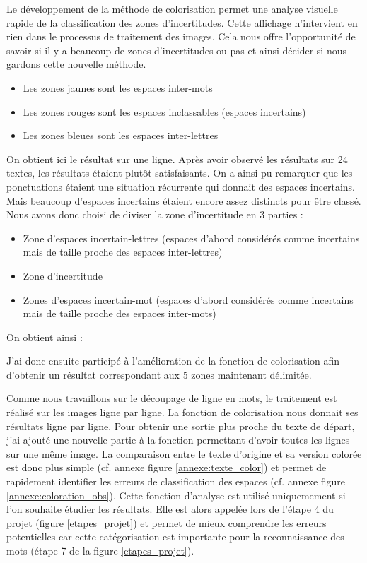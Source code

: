 \documentclass[12pt,a4paper]{article}
\begin{document}
Le développement de la méthode de colorisation permet une analyse visuelle rapide de la classification des zones d'incertitudes. Cette affichage n'intervient en rien dans le processus de traitement des images. Cela nous offre l'opportunité de savoir si il y a beaucoup de zones d'incertitudes ou pas et ainsi décider si nous gardons cette nouvelle méthode.\bigbreak



\begin{itemize}
    \item Les zones jaunes sont les espaces inter-mots
    \item Les zones rouges sont les espaces inclassables (espaces incertains)
    \item Les zones bleues sont les espaces inter-lettres
\end{itemize}

\bigbreak
On obtient ici le résultat sur une ligne. Après avoir observé les résultats sur 24 textes, les résultats étaient plutôt satisfaisants. On a ainsi pu remarquer que les ponctuations étaient une situation récurrente qui donnait des espaces incertains. Mais beaucoup d’espaces incertains étaient encore assez distincts pour être classé.\bigbreak
Nous avons donc choisi de diviser la zone d’incertitude en 3 parties :
\begin{itemize}
    \item Zone d’espaces incertain-lettres (espaces d’abord considérés comme incertains mais de taille proche des espaces inter-lettres)
    \item Zone d’incertitude
    \item Zones d’espaces incertain-mot (espaces d’abord considérés comme incertains mais de taille proche des espaces inter-mots)
\end{itemize}

\bigbreak
On obtient ainsi :


J’ai donc ensuite participé à l’amélioration de la fonction de colorisation afin d’obtenir un résultat correspondant aux 5 zones maintenant délimitée.



Comme nous travaillons sur le découpage de ligne en mots, le traitement est réalisé sur les images ligne par ligne. La fonction de colorisation nous donnait ses résultats ligne par ligne. Pour obtenir une sortie plus proche du texte de départ, j’ai ajouté une nouvelle partie à la fonction permettant d’avoir toutes les lignes sur une même image. La comparaison entre le texte d’origine et sa version colorée est donc plus simple (cf. annexe figure \ref{annexe:texte_color}) et permet de rapidement identifier les erreurs de classification des espaces (cf. annexe figure \ref{annexe:coloration_obs}).\bigbreak
Cette fonction d'analyse est utilisé uniquemement si l'on souhaite étudier les résultats. Elle est alors appelée lors de l’étape 4 du projet (figure \ref{etapes_projet}) et permet de mieux comprendre les erreurs potentielles car cette catégorisation est importante pour la reconnaissance des mots (étape 7 de la figure \ref{etapes_projet}).
\end{document}
